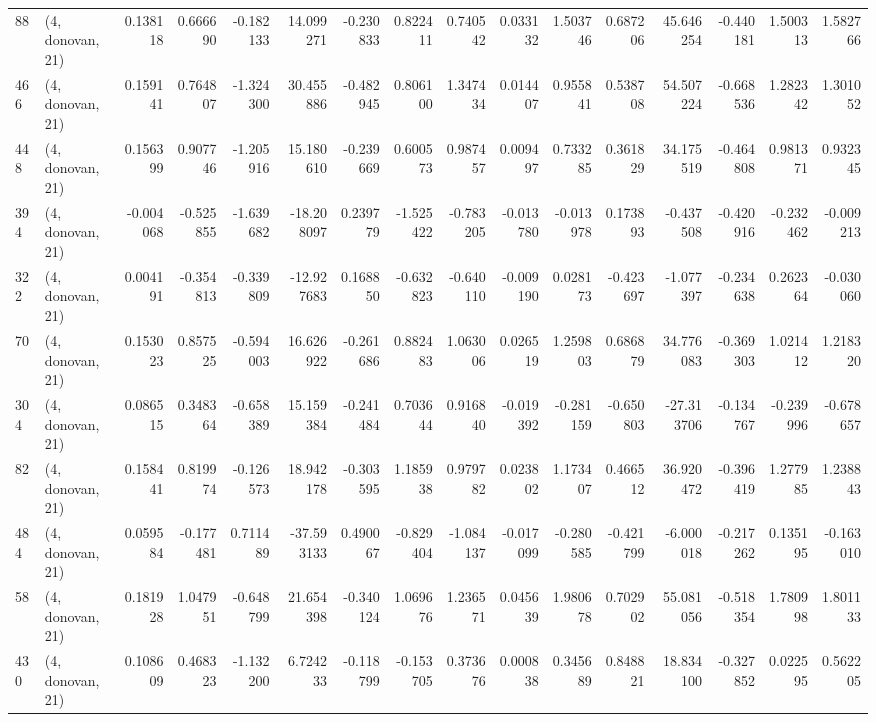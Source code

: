 \begin{tabular}{llrrrrrrrrrrrrrr}
88  &  (4, donovan, 21) &   0.138118 &  0.666690 & -0.182133 &   14.099271 & -0.230833 &   0.822411 &  0.740542 &  0.033132 &  1.503746 &  0.687206 &    45.646254 & -0.440181 &  1.500313 &  1.582766 \\
466 &  (4, donovan, 21) &   0.159141 &  0.764807 & -1.324300 &   30.455886 & -0.482945 &   0.806100 &  1.347434 &  0.014407 &  0.955841 &  0.538708 &    54.507224 & -0.668536 &  1.282342 &  1.301052 \\
448 &  (4, donovan, 21) &   0.156399 &  0.907746 & -1.205916 &   15.180610 & -0.239669 &   0.600573 &  0.987457 &  0.009497 &  0.733285 &  0.361829 &    34.175519 & -0.464808 &  0.981371 &  0.932345 \\
394 &  (4, donovan, 21) &  -0.004068 & -0.525855 & -1.639682 &  -18.208097 &  0.239779 &  -1.525422 & -0.783205 & -0.013780 & -0.013978 &  0.173893 &    -0.437508 & -0.420916 & -0.232462 & -0.009213 \\
322 &  (4, donovan, 21) &   0.004191 & -0.354813 & -0.339809 &  -12.927683 &  0.168850 &  -0.632823 & -0.640110 & -0.009190 &  0.028173 & -0.423697 &    -1.077397 & -0.234638 &  0.262364 & -0.030060 \\
70  &  (4, donovan, 21) &   0.153023 &  0.857525 & -0.594003 &   16.626922 & -0.261686 &   0.882483 &  1.063006 &  0.026519 &  1.259803 &  0.686879 &    34.776083 & -0.369303 &  1.021412 &  1.218320 \\
304 &  (4, donovan, 21) &   0.086515 &  0.348364 & -0.658389 &   15.159384 & -0.241484 &   0.703644 &  0.916840 & -0.019392 & -0.281159 & -0.650803 &   -27.313706 & -0.134767 & -0.239996 & -0.678657 \\
82  &  (4, donovan, 21) &   0.158441 &  0.819974 & -0.126573 &   18.942178 & -0.303595 &   1.185938 &  0.979782 &  0.023802 &  1.173407 &  0.466512 &    36.920472 & -0.396419 &  1.277985 &  1.238843 \\
484 &  (4, donovan, 21) &   0.059584 & -0.177481 &  0.711489 &  -37.593133 &  0.490067 &  -0.829404 & -1.084137 & -0.017099 & -0.280585 & -0.421799 &    -6.000018 & -0.217262 &  0.135195 & -0.163010 \\
58  &  (4, donovan, 21) &   0.181928 &  1.047951 & -0.648799 &   21.654398 & -0.340124 &   1.069676 &  1.236571 &  0.045639 &  1.980678 &  0.702902 &    55.081056 & -0.518354 &  1.780998 &  1.801133 \\
430 &  (4, donovan, 21) &   0.108609 &  0.468323 & -1.132200 &    6.724233 & -0.118799 &  -0.153705 &  0.373676 &  0.000838 &  0.345689 &  0.848821 &    18.834100 & -0.327852 &  0.022595 &  0.562205 \\

\end{tabular}
